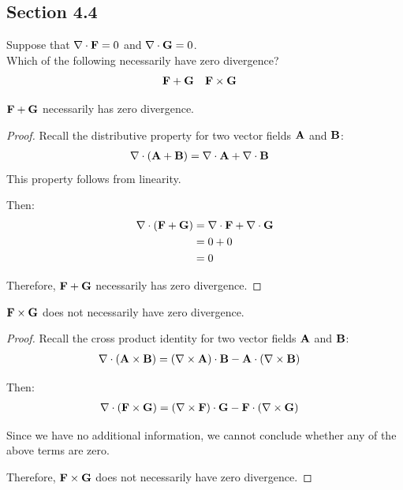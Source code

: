 \subsection{Section 4.4}

\begin{tcolorbox}[
        title={Problem 36},
        valign=center,
        nobeforeafter,
        colframe=gray!95!black
    ]
    
    Suppose that \(\nabla \cdot \vb{F} = 0\) and \(\nabla \cdot \vb{G} = 0\). \\
    
    Which of the following necessarily have zero divergence?
    \begin{align}
        \vb{F} &+ \vb{G} & \vb{F} &\times \vb{G}
    \end{align}
\end{tcolorbox}

\begin{claim}
    \(\vb{F} + \vb{G}\) necessarily has zero divergence.
\end{claim}

\begin{proof}
    Recall the distributive property for two vector fields \(\vb{A}\) and \(\vb{B}\):
    \begin{align}
        \nabla \cdot (\vb{A} + \vb{B}) &= \nabla \cdot \vb{A} + \nabla \cdot \vb{B}
    \end{align}
    This property follows from linearity. 
    
    Then:
    \begin{align*}
        \nabla \cdot (\vb{F} + \vb{G}) &= \nabla \cdot \vb{F} + \nabla \cdot \vb{G} \\
        &= 0 + 0 \\
        &= 0
    \end{align*}
    
    Therefore, \(\vb{F} + \vb{G}\) necessarily has zero divergence.
\end{proof}

\begin{claim}
    \(\vb{F} \times \vb{G}\) does not necessarily have zero divergence.
\end{claim}

\begin{proof}
    Recall the cross product identity for two vector fields \(\vb{A}\) and \(\vb{B}\):
    \begin{align}
        \nabla \cdot (\vb{A} \times \vb{B}) &= (\nabla \times \vb{A}) \cdot \vb{B} - \vb{A} \cdot (\nabla \times \vb{B})
    \end{align}
    
    Then:
    \begin{align*}
        \nabla \cdot (\vb{F} \times \vb{G}) &= (\nabla \times \vb{F}) \cdot \vb{G} - \vb{F} \cdot (\nabla \times \vb{G})
    \end{align*}
    
    Since we have no additional information, we cannot conclude whether any of the above terms are zero.
    
    Therefore, \(\vb{F} \times \vb{G}\) does not necessarily have zero divergence.
\end{proof}

